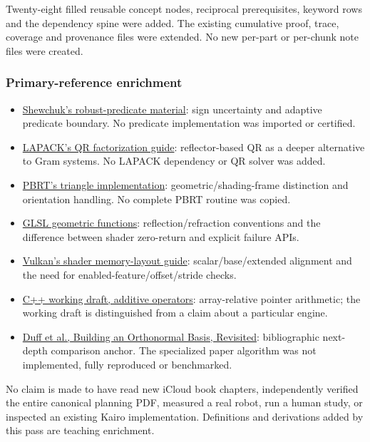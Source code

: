 Twenty-eight filled reusable concept nodes, reciprocal prerequisites, keyword rows and the dependency spine were added. The existing cumulative proof, trace, coverage and provenance files were extended. No new per-part or per-chunk note files were created.

\subsubsection{Primary-reference enrichment}\label{appendix-a103e7846d21-primary-reference-enrichment-1}

\begin{itemize}
\tightlist
\item
  \href{https://www.cs.cmu.edu/~quake/robust.html}{Shewchuk's robust-predicate material}: sign uncertainty and adaptive predicate boundary. No predicate implementation was imported or certified.
\item
  \href{https://www.netlib.org/lapack/lug/node40.html}{LAPACK's QR factorization guide}: reflector-based QR as a deeper alternative to Gram systems. No LAPACK dependency or QR solver was added.
\item
  \href{https://www.pbr-book.org/4ed/Shapes/Triangle_Meshes}{PBRT's triangle implementation}: geometric/shading-frame distinction and orientation handling. No complete PBRT routine was copied.
\item
  \href{https://registry.khronos.org/OpenGL/specs/gl/GLSLangSpec.4.60.html\#geometric-functions}{GLSL geometric functions}: reflection/refraction conventions and the difference between shader zero-return and explicit failure APIs.
\item
  \href{https://docs.vulkan.org/guide/latest/shader_memory_layout.html}{Vulkan's shader memory-layout guide}: scalar/base/extended alignment and the need for enabled-feature/offset/stride checks.
\item
  \href{https://eel.is/c++draft/expr.add}{C++ working draft, additive operators}: array-relative pointer arithmetic; the working draft is distinguished from a claim about a particular engine.
\item
  \href{https://graphics.pixar.com/library/OrthonormalB/paper.pdf}{Duff et al., Building an Orthonormal Basis, Revisited}: bibliographic next-depth comparison anchor. The specialized paper algorithm was not implemented, fully reproduced or benchmarked.
\end{itemize}

No claim is made to have read new iCloud book chapters, independently verified the entire canonical planning PDF, measured a real robot, run a human study, or inspected an existing Kairo implementation. Definitions and derivations added by this pass are teaching enrichment.

